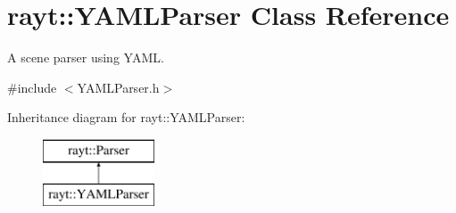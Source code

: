 \hypertarget{classrayt_1_1_y_a_m_l_parser}{}\section{rayt\+::Y\+A\+M\+L\+Parser Class Reference}
\label{classrayt_1_1_y_a_m_l_parser}


A scene parser using Y\+A\+ML.  




{\ttfamily \#include $<$Y\+A\+M\+L\+Parser.\+h$>$}

Inheritance diagram for rayt\+::Y\+A\+M\+L\+Parser\+:\begin{figure}[H]
\begin{center}
\leavevmode
\includegraphics[height=2.000000cm]{classrayt_1_1_y_a_m_l_parser}
\end{center}
\end{figure}

